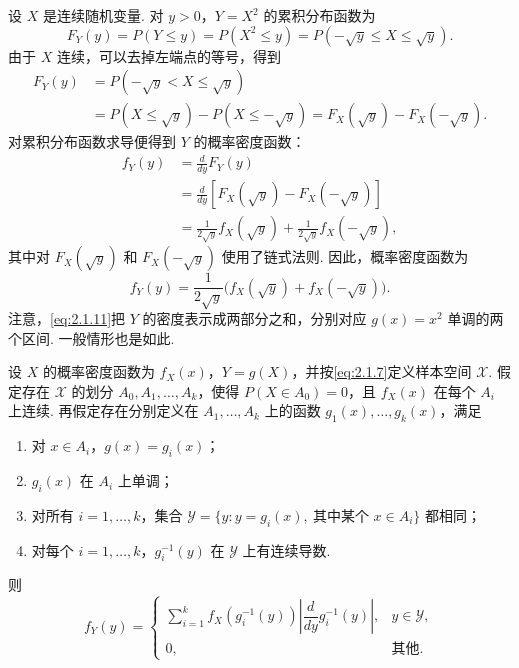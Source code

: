 \begin{example}[平方变换]\label{ex:2.1.7}
设 $X$ 是连续随机变量. 对 $y>0$，$Y=X^2$ 的累积分布函数为
$$F_Y(y)=P(Y\le y)=P(X^2\le y)=P(-\sqrt y\le X\le\sqrt y).$$
由于 $X$ 连续，可以去掉左端点的等号，得到
$$\begin{aligned}
F_Y(y)&=P(-\sqrt y<X\le\sqrt y)\\
&=P(X\le\sqrt y)-P(X\le-\sqrt y)=F_X(\sqrt y)-F_X(-\sqrt y).
\end{aligned}$$
对累积分布函数求导便得到 $Y$ 的概率密度函数：
$$\begin{aligned}
f_Y(y)&=\frac d{dy}F_Y(y)\\
&=\frac d{dy}[F_X(\sqrt y)-F_X(-\sqrt y)]\\
&=\frac1{2\sqrt y}f_X(\sqrt y)+\frac1{2\sqrt y}f_X(-\sqrt y),
\end{aligned}$$
其中对 $F_X(\sqrt y)$ 和 $F_X(-\sqrt y)$ 使用了链式法则. 因此，概率密度函数为
\begin{equation}\label{eq:2.1.11}
f_Y(y)=\frac1{2\sqrt y}\bigl(f_X(\sqrt y)+f_X(-\sqrt y)\bigr).
\end{equation}
注意，\eqref{eq:2.1.11}把 $Y$ 的密度表示成两部分之和，分别对应 $g(x)=x^2$ 单调的两个区间. 一般情形也是如此.
\end{example}

\begin{theorem}\label{thm:2.1.8}
设 $X$ 的概率密度函数为 $f_X(x)$，$Y=g(X)$，并按\eqref{eq:2.1.7}定义样本空间 $\mathscr X$. 假定存在 $\mathscr X$ 的划分 $A_0,A_1,\ldots,A_k$，使得 $P(X\in A_0)=0$，且 $f_X(x)$ 在每个 $A_i$ 上连续. 再假定存在分别定义在 $A_1,\ldots,A_k$ 上的函数 $g_1(x),\ldots,g_k(x)$，满足
\begin{enumerate}
\item[(i)] 对 $x\in A_i$，$g(x)=g_i(x)$；
\item[(ii)] $g_i(x)$ 在 $A_i$ 上单调；
\item[(iii)] 对所有 $i=1,\ldots,k$，集合 $\mathscr Y=\{y:y=g_i(x),\ \text{其中某个 }x\in A_i\}$ 都相同；
\item[(iv)] 对每个 $i=1,\ldots,k$，$g_i^{-1}(y)$ 在 $\mathscr Y$ 上有连续导数.
\end{enumerate}
则
$$f_Y(y)=\begin{cases}
\displaystyle\sum_{i=1}^k f_X(g_i^{-1}(y))\left|\dfrac d{dy}g_i^{-1}(y)\right|,&y\in\mathscr Y,\\
0,&\text{其他}.
\end{cases}$$
\end{theorem}

